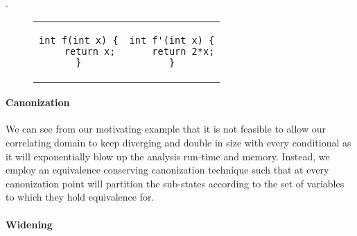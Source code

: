 .

\begin{figure}
\begin{tabular}{cc}
\centering
\begin{lstlisting}
int f(int x) {
    return x;
}
\end{lstlisting}
&
\begin{lstlisting}
int f'(int x) {
    return 2*x;
}
\end{lstlisting}
\end{tabular}
\end{figure}

\paragraph{Canonization}
We can see from our motivating example that it is not feasible to allow our correlating domain to keep diverging and double in size with every conditional as it will exponentially blow up the analysis run-time and memory. Instead, we employ an equivalence conserving canonization technique such that at every canonization point will partition the sub-states according to the set of variables to which they hold equivalence for.  %

\paragraph{Widening}



